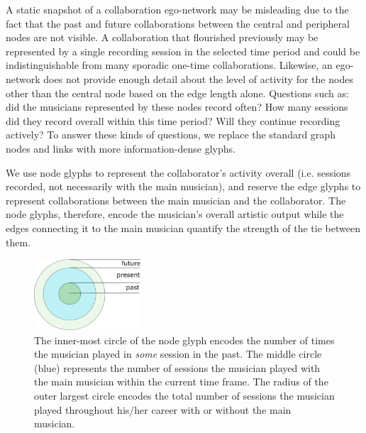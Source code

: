 \documentclass[12pt]{cmuthesis}
\begin{document}
  A static snapshot of a collaboration ego-network may be misleading due to the fact
  that the past and future collaborations between the central and peripheral nodes
  are not visible. A collaboration that flourished previously may be represented
  by a single recording session in the selected time period and could be
  indistinguishable from many sporadic one-time collaborations. Likewise, an
  ego-network does not provide enough detail about the level of activity for the
  nodes other than the central node based on the edge length alone. Questions such
  as: did the musicians represented by these nodes record often? How many sessions
  did they record overall within this time period? Will they continue recording
  actively? To answer these kinds of questions, we replace the standard graph
  nodes and links with more information-dense glyphs.

  We use node glyphs to represent the collaborator's activity overall
  (i.e. sessions recorded, not necessarily with the main musician), and reserve
  the edge glyphs to represent collaborations between the main musician and the
  collaborator. The node glyphs, therefore, encode the musician's overall artistic
  output while the edges connecting it to the main musician quantify the strength
  of the tie between them.

  \begin{figure}[t]
    \centering
    \includegraphics[height=100px]{node-glyph}
    \caption{The inner-most circle of the node glyph encodes the number of times
  the musician played in \emph{some} session in the past. The middle circle (blue)
  represents the number of sessions the musician played with the main musician
  within the current time frame. The radius of the outer largest circle encodes
  the total number of sessions the musician played throughout his/her career with
  or without the main musician.}
    \label{fig:node_glyphs}
  \end{figure}
\end{document}
